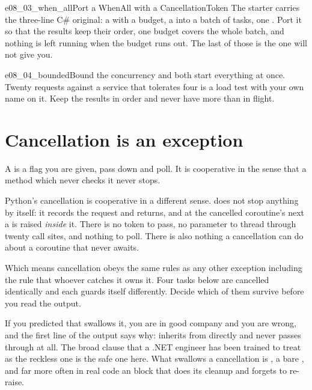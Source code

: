 \begin{exercise}{e08_03_when_all}{Port a WhenAll with a CancellationToken}
The starter carries the three-line C\# original: a
 with a budget, a  into a batch
of tasks, one . Port it so that the results keep their
order, one budget covers the whole batch, and nothing is left running when
the budget runs out. The last of those is the one  will not
give you.
\end{exercise}

\begin{exercise}{e08_04_bounded}{Bound the concurrency}
 and  both start everything at once. Twenty
requests against a service that tolerates four is a load test with your
own name on it. Keep the results in order and never have more than
 in flight.
\end{exercise}

\section{Cancellation is an exception}
\label{sec:asyncio-cancel}

A  is a flag you are given, pass down and poll. It
is cooperative in the sense that a method which never checks it never
stops.

Python's cancellation is cooperative in a different sense.
 does not stop anything by itself: it records the
request and returns, and at the cancelled coroutine's next  a
 is raised \emph{inside} it. There is no token to
pass, no parameter to thread through twenty call sites, and nothing to
poll. There is also nothing a cancellation can do about a coroutine that
never awaits.

Which means cancellation obeys the same rules as any other exception \dash{}
including the rule that whoever catches it owns it. Four tasks below are
cancelled identically and each guards itself differently. Decide which of
them survive before you read the output.



\noindent
If you predicted that  swallows it, you are in
good company and you are wrong, and the first line of the output says why:
 inherits from  directly and never
passes through  at all. The broad clause that a .NET
engineer has been trained to treat as the reckless one is the safe one
here. What swallows a cancellation is , a bare
, and \dash{} far more often in real code \dash{} an
 block that does its cleanup and
forgets to re-raise.


